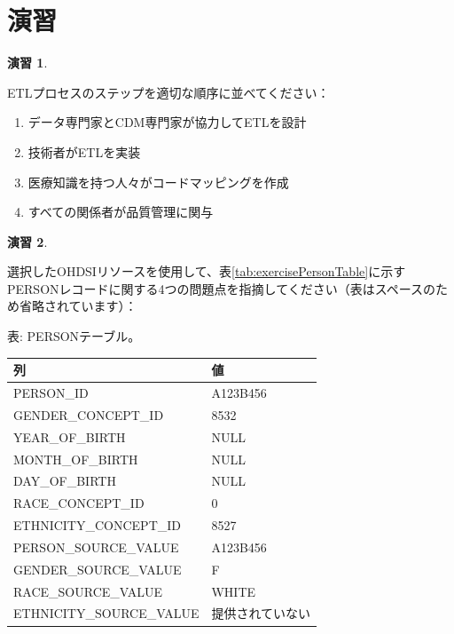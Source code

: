 \documentclass[
  11pt]{book}
\providecommand{\tightlist}{%
  \setlength{\itemsep}{0pt}\setlength{\parskip}{0pt}}
\theoremstyle{definition}
\theoremstyle{definition}
\theoremstyle{definition}
\newtheorem{exercise}{演習}[chapter]
\theoremstyle{definition}
\theoremstyle{remark}
\begin{document}
\section{演習}\label{ux6f14ux7fd2-1}

\begin{exercise}
\protect\hypertarget{exr:exerciseEtl1}{}\label{exr:exerciseEtl1}

ETLプロセスのステップを適切な順序に並べてください：

\begin{enumerate}
\def\labelenumi{\Alph{enumi})}
\tightlist
\item
  データ専門家とCDM専門家が協力してETLを設計
\item
  技術者がETLを実装
\item
  医療知識を持つ人々がコードマッピングを作成
\item
  すべての関係者が品質管理に関与
\end{enumerate}

\end{exercise}

\begin{exercise}
\protect\hypertarget{exr:exerciseEtl2}{}\label{exr:exerciseEtl2}

選択したOHDSIリソースを使用して、表\ref{tab:exercisePersonTable}に示すPERSONレコードに関する4つの問題点を指摘してください（表はスペースのため省略されています）：

表: \label{tab:exercisePersonTable} PERSONテーブル。

\begin{longtable}[]{@{}ll@{}}
\toprule\noalign{}
列 & 値 \\
\midrule\noalign{}
\endhead
\bottomrule\noalign{}
\endlastfoot
PERSON\_ID & A123B456 \\
GENDER\_CONCEPT\_ID & 8532 \\
YEAR\_OF\_BIRTH & NULL \\
MONTH\_OF\_BIRTH & NULL \\
DAY\_OF\_BIRTH & NULL \\
RACE\_CONCEPT\_ID & 0 \\
ETHNICITY\_CONCEPT\_ID & 8527 \\
PERSON\_SOURCE\_VALUE & A123B456 \\
GENDER\_SOURCE\_VALUE & F \\
RACE\_SOURCE\_VALUE & WHITE \\
ETHNICITY\_SOURCE\_VALUE & 提供されていない \\
\end{longtable}

\end{exercise}
\end{document}
